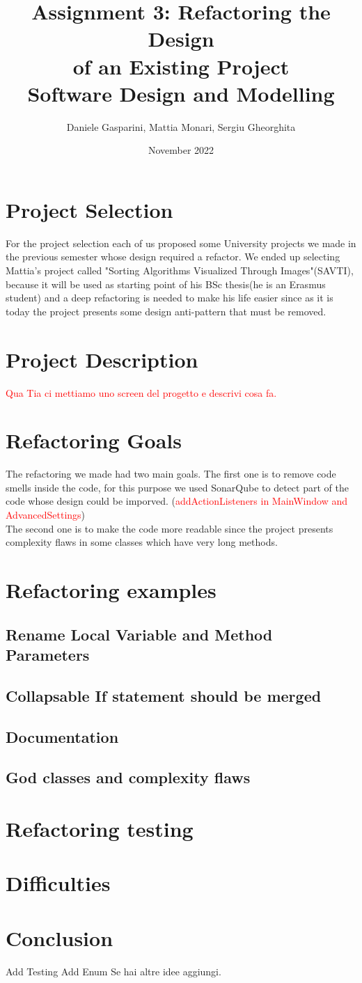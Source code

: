 \documentclass{article}
\title{Assignment 3: Refactoring the Design\\
of an Existing Project\\
\large Software Design and Modelling}
\author{Daniele Gasparini, Mattia Monari, Sergiu Gheorghita}
\date{\nth{25} November 2022}
\begin{document}
\maketitle

\section{Project Selection}
For the project selection each of us proposed some University projects we made in the previous semester whose design required a refactor. We ended up selecting Mattia's project called "Sorting Algorithms Visualized Through Images"(SAVTI), because it will be used as starting point of his BSc thesis(he is an Erasmus student) and a deep refactoring is needed to make his life easier since as it is today the project presents some design anti-pattern that must be removed.

\section{Project Description}
\textcolor{red}{Qua Tia ci mettiamo uno screen del progetto e descrivi cosa fa.}
\section{Refactoring Goals}
The refactoring we made had two main goals. The first one is to remove code smells inside the code, for this purpose we used SonarQube to detect part of the code whose design could be imporved. 
(\textcolor{red}{addActionListeners in MainWindow and AdvancedSettings})\\
The second one is to make the code more readable since the project presents complexity flaws in some classes which have very long methods.

\section{Refactoring examples}
\subsection{Rename Local Variable and Method Parameters}
\subsection{Collapsable If statement should be merged}
\subsection{Documentation}
\subsection{God classes and complexity flaws}

\section{Refactoring testing} 

\section{Difficulties}


\section{Conclusion}
Add Testing
Add Enum
Se hai altre idee aggiungi.
\end{document}
